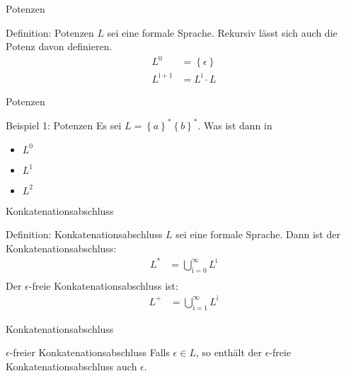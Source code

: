 \begin{frame}{Potenzen}
    \begin{block}{Definition: Potenzen}
        $L$ sei eine formale Sprache. Rekursiv lässt sich auch die Potenz davon definieren.
        \begin{align*}
            L^0 &= \left\{ \epsilon\right\}\\
            L^\mathrm{i + 1} &= L^\mathrm{i} \cdot L
        \end{align*}
    \end{block}
\end{frame}
\begin{frame}{Potenzen}
    \begin{exampleblock}{Beispiel 1: Potenzen}
        Es sei $L = \left\{ a\right\}^* \left\{ b\right\}^*$. Was ist dann in
        \begin{itemize}
            \item $L^0$
                \pause
            \item $L^1$
                \pause
            \item $L^2$
        \end{itemize}
    \end{exampleblock}
\end{frame}
        
\begin{frame}{Konkatenationsabschluss}
    \begin{block}{Definition: Konkatenationsabschluss}
        $L$ sei eine formale Sprache. Dann ist der Konkatenationsabschluss:
        \begin{align*}
            L^* &= \bigcup_\mathrm{i = 0}^\infty L^\mathrm{i}\\
        \end{align*}
        Der $\epsilon$-freie Konkatenationsabschluss ist:
        \begin{align*}
            L^+ &= \bigcup_\mathrm{i = 1}^\infty L^\mathrm{i}
        \end{align*}
    \end{block}
\end{frame}

\begin{frame}{Konkatenationsabschluss}
    \begin{alertblock}{$\epsilon$-freier Konkatenationsabschluss}
        Falls $\epsilon \in L$, so enthält der $\epsilon$-freie Konkatenationsabschluss auch $\epsilon$.
    \end{alertblock}
\end{frame}

